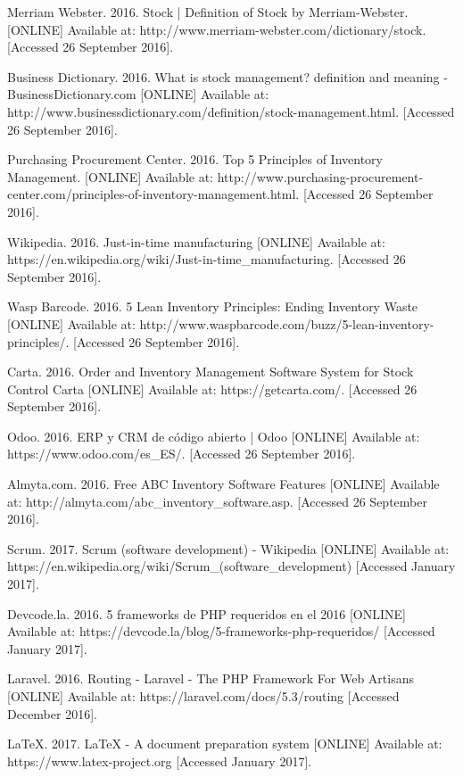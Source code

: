 \begin{thebibliography}{9}

Merriam Webster. 2016. Stock | Definition of Stock by Merriam-Webster. [ONLINE] Available at: http://www.merriam-webster.com/dictionary/stock. [Accessed 26 September 2016].

Business Dictionary. 2016. What is stock management? definition and meaning - BusinessDictionary.com [ONLINE] Available at: http://www.businessdictionary.com/definition/stock-management.html. [Accessed 26 September 2016].

Purchasing Procurement Center. 2016. Top 5 Principles of Inventory Management. [ONLINE] Available at: http://www.purchasing-procurement-center.com/principles-of-inventory-management.html. [Accessed 26 September 2016].

Wikipedia. 2016. Just-in-time manufacturing [ONLINE] Available at: https://en.wikipedia.org/wiki/Just-in-time\_manufacturing. [Accessed 26 September 2016].

Wasp Barcode. 2016. 5 Lean Inventory Principles: Ending Inventory Waste [ONLINE] Available at: http://www.waspbarcode.com/buzz/5-lean-inventory-principles/. [Accessed 26 September 2016].

Carta. 2016. Order and Inventory Management Software System for Stock Control Carta [ONLINE] Available at: https://getcarta.com/. [Accessed 26 September 2016].

Odoo. 2016. ERP y CRM de código abierto | Odoo [ONLINE] Available at: https://www.odoo.com/es\_ES/. [Accessed 26 September 2016].

Almyta.com. 2016. Free ABC Inventory Software Features [ONLINE] Available at: http://almyta.com/abc\_inventory\_software.asp. [Accessed 26 September 2016].

Scrum. 2017. Scrum (software development) - Wikipedia [ONLINE] Available at: https://en.wikipedia.org/wiki/Scrum\_(software\_development) [Accessed January 2017].

Devcode.la. 2016. 5 frameworks de PHP requeridos en el 2016 [ONLINE] Available at: https://devcode.la/blog/5-frameworks-php-requeridos/ [Accessed January 2017].

Laravel. 2016. Routing - Laravel - The PHP Framework For Web Artisans [ONLINE] Available at: https://laravel.com/docs/5.3/routing [Accessed December 2016].

LaTeX. 2017. LaTeX - A document preparation system [ONLINE] Available at: https://www.latex-project.org [Accessed January 2017].

\end{thebibliography}